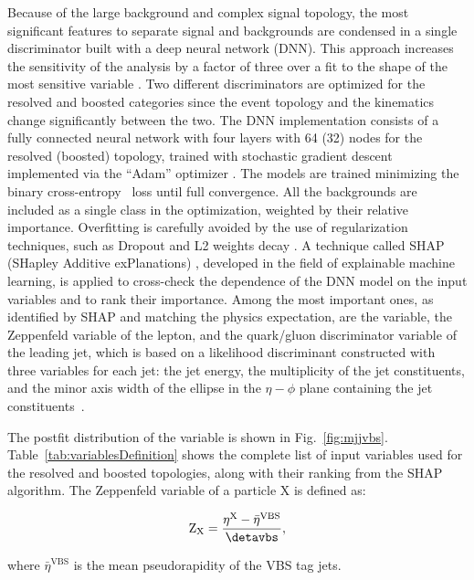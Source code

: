 Because of the large background and complex signal topology, the most significant features to separate signal and
backgrounds are condensed in a single discriminator built with a deep neural network (DNN).  This approach increases the
sensitivity of the analysis by a factor of three over a fit to the shape of the most sensitive variable \mjjvbs.
Two different discriminators are optimized for the resolved and boosted categories since the event topology and the
kinematics change significantly between the two.  The DNN implementation consists of a fully connected neural network
with four layers with 64 (32) nodes for the resolved (boosted) topology, trained with stochastic gradient descent
implemented via the ``Adam'' optimizer \cite{kingma_adam:_2017}.  The models are trained minimizing the binary
cross-entropy~\cite{binary_crossentropy,Goodfellow-et-al-2016} loss until full convergence.  All the backgrounds are
included as a single class in the optimization, weighted by their relative importance.  Overfitting is carefully avoided
by the use of regularization techniques, such as Dropout and L2 weights decay \cite{Goodfellow-et-al-2016}.  A technique
called SHAP (SHapley Additive exPlanations) \cite{Lundberg2017,shapley_values}, developed in the field of explainable machine
learning, is applied to cross-check the dependence of the DNN model on the input variables and to rank their importance.
Among the most important ones, as identified by SHAP and matching the physics expectation, are the
\mjjvbs variable, the Zeppenfeld variable \cite{Rainwater:1996ud} of the lepton, and the quark/gluon discriminator 
variable of the leading \vhad jet, which is based on a likelihood discriminant constructed with three variables for
each jet: the jet energy, the multiplicity of the jet constituents, 
and the minor axis width of the ellipse in the $\eta-\phi$ plane containing the jet constituents~\cite{CMS:2013kfa,CMS-DP-2016-070}.

The postfit distribution of the \mjjvbs variable is shown in Fig.~\ref{fig:mjjvbs}.
Table~\ref{tab:variablesDefinition} shows the complete list of input variables used for the resolved and boosted
topologies, along with their ranking from the SHAP algorithm.  The Zeppenfeld variable of a particle X is defined as:
\begin{linenomath}
\begin{equation}
  \mathrm{Z}_{\mathrm{X}} = \frac{\eta^{\mathrm{X}} - \bar{\eta}^{\mathrm{VBS}}}{\detavbs},
\end{equation}
\end{linenomath}
where $\bar{\eta}^{\mathrm{VBS}}$ is the mean pseudorapidity of the VBS tag jets.


